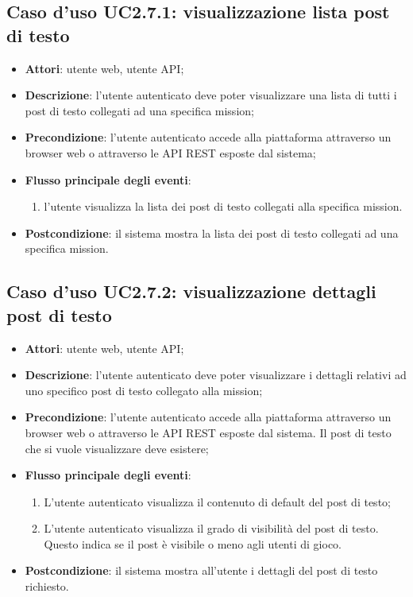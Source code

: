 \subsection{Caso d'uso UC2.7.1: visualizzazione lista post di testo}
\begin{itemize}
\item \textbf{Attori}: utente web, utente API;
\item \textbf{Descrizione}: l'utente autenticato deve poter visualizzare una lista di tutti i post di testo collegati ad una specifica mission; 
      \item \textbf{Precondizione}: l'utente autenticato accede alla piattaforma attraverso un browser web o attraverso le API REST esposte dal sistema;

        \item \textbf{Flusso principale degli eventi}:
          \begin{enumerate}
          \item l'utente visualizza la lista dei post di testo collegati alla specifica mission.

      \end{enumerate}
    \item \textbf{Postcondizione}: il sistema mostra la lista dei post di testo collegati ad una specifica mission.
  \end{itemize}
\hypertarget{UC2.7.2}{}
\subsection{Caso d'uso UC2.7.2: visualizzazione dettagli post di testo}
\begin{itemize}
\item \textbf{Attori}: utente web, utente API;
\item \textbf{Descrizione}: l'utente autenticato deve poter visualizzare i dettagli relativi ad uno specifico post di testo collegato alla mission; 
      \item \textbf{Precondizione}: l'utente autenticato accede alla piattaforma attraverso un browser web o attraverso le API REST esposte dal sistema. Il post di testo che si vuole visualizzare deve esistere;

        \item \textbf{Flusso principale degli eventi}:
          \begin{enumerate}
          \item L'utente autenticato visualizza il contenuto di default del post di testo;
          \item L'utente autenticato visualizza il grado di visibilità del post di testo. Questo indica se il post è visibile o meno agli utenti di gioco.

      \end{enumerate}
    \item \textbf{Postcondizione}: il sistema mostra all'utente i dettagli del post di testo richiesto.
  \end{itemize}
\hypertarget{UC2.7.3}{}
